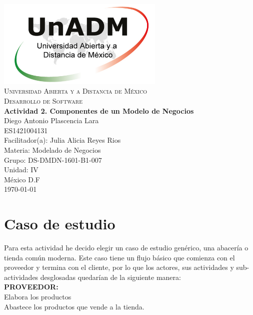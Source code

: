 \documentclass[spanish,12pt,letterpapper]{article}
\begin{document}
	\begin{titlepage}
		\begin{center}
			\includegraphics[width=0.6\textwidth]{../logoUnADM}~\\[1cm] 
			\textsc{Universidad Abierta y a Distancia de México}\\[0.8cm]
			\textsc{Desarrollo de Software}\\[1.8cm]
			
			\textbf{ \Large Actividad 2. Componentes de un Modelo de Negocios }\\[3cm]
			
			Diego Antonio Plascencia Lara\\ ES1421004131 \\[0.4cm]
			Facilitador(a): Julia Alicia Reyes Rios\\
			Materia: Modelado de Negocios\\
			Grupo: DS-DMDN-1601-B1-007 \\
			Unidad: IV \\
			
			\vfill México D.F\\{\today}
			
		\end{center}
	\end{titlepage}
	
	\section{Caso de estudio}
	Para esta actividad he decido elegir un caso de estudio genérico, una abacería o tienda común moderna. Este caso tiene un flujo básico que comienza con el proveedor y termina con el cliente, por lo que los actores, sus actividades y sub-actividades desglosadas quedarían de la siguiente manera:\\
	
	\textbf{PROVEEDOR:\\}
	Elabora los productos\\
	Abastece los productos que vende a la tienda.\\	
	
\end{document}
